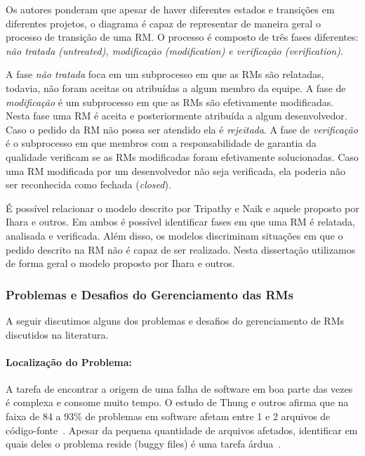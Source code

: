Os autores ponderam que apesar de haver diferentes estados e transições em
diferentes projetos, o diagrama é capaz de representar de maneira geral o
processo de transição de uma RM\@. O processo é composto de três fases
diferentes: \textit{não tratada (untreated), modificação (modification) e
    verificação (verification)}.

A fase \textit{não tratada} foca em um subprocesso em que as RMs são relatadas,
todavia, não foram aceitas ou atribuídas a algum membro da equipe. A fase de
\textit{modificação} é um subprocesso em que as RMs são efetivamente
modificadas. Nesta fase uma RM é aceita e posteriormente atribuída a algum
desenvolvedor. Caso o pedido da RM não possa ser atendido ela é
\textit{rejeitada}. A fase de \textit{verificação} é o subprocesso em que
membros com a responsabilidade de garantia da qualidade verificam se as RMs
modificadas foram efetivamente solucionadas. Caso uma RM modificada por um
desenvolvedor não seja verificada, ela poderia não ser reconhecida como fechada
(\textit{closed}).

É possível relacionar o modelo descrito por Tripathy e Naik e aquele proposto
por Ihara e outros. Em ambos é possível identificar fases em que uma RM é
relatada, analisada e verificada. Além disso, os modelos discriminam situações
em que o pedido descrito na RM não é capaz de ser realizado. Nesta dissertação
utilizamos de forma geral o modelo proposto por Ihara e outros.

\subsubsection{Problemas e Desafios do Gerenciamento das RMs}\label{ssub:problemas_relacionadas_rm}

A seguir discutimos alguns dos problemas e desafios do gerenciamento de RMs
discutidos na literatura.

\paragraph{Localização do Problema:}

A tarefa de encontrar a origem de uma falha de software em boa parte das vezes é
complexa e consome muito tempo. O estudo de Thung e outros afirma que na faixa
de 84 a 93\% de problemas em software afetam entre 1 e 2 arquivos de
código-fonte~\cite{thung2012faults}. Apesar da pequena quantidade de arquivos
afetados, identificar em quais deles o problema reside (buggy files) é uma
tarefa árdua~\cite{Thung:2014:BIT:2635868.2661678}.

